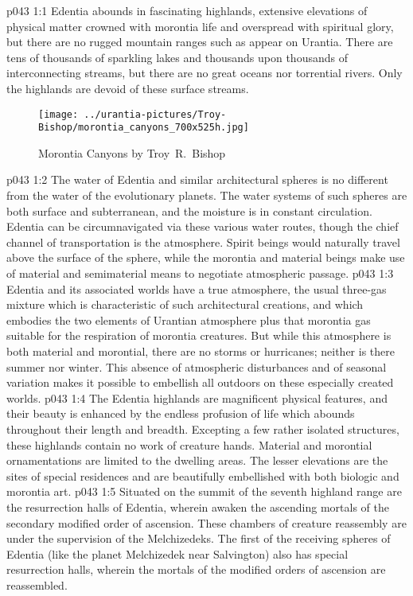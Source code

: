 \vs p043 1:1 Edentia abounds in fascinating highlands, extensive elevations of physical matter crowned with morontia life and overspread with spiritual glory, but there are no rugged mountain ranges such as appear on Urantia. There are tens of thousands of sparkling lakes and thousands upon thousands of interconnecting streams, but there are no great oceans nor torrential rivers. Only the highlands are devoid of these surface streams.
\begin{figure}[H]
\centering
\texttt{[image: ../urantia-pictures/Troy-Bishop/morontia\_canyons\_700x525h.jpg]}
\caption{Morontia Canyons by Troy~R.~Bishop}
\end{figure}
\vs p043 1:2 The water of Edentia and similar architectural spheres is no different from the water of the evolutionary planets. The water systems of such spheres are both surface and subterranean, and the moisture is in constant circulation. Edentia can be circumnavigated via these various water routes, though the chief channel of transportation is the atmosphere. Spirit beings would naturally travel above the surface of the sphere, while the morontia and material beings make use of material and semimaterial means to negotiate atmospheric passage.
\vs p043 1:3 Edentia and its associated worlds have a true atmosphere, the usual three\hyp{}gas mixture which is characteristic of such architectural creations, and which embodies the two elements of Urantian atmosphere plus that morontia gas suitable for the respiration of morontia creatures. But while this atmosphere is both material and morontial, there are no storms or hurricanes; neither is there summer nor winter. This absence of atmospheric disturbances and of seasonal variation makes it possible to embellish all outdoors on these especially created worlds.
\vs p043 1:4 The Edentia highlands are magnificent physical features, and their beauty is enhanced by the endless profusion of life which abounds throughout their length and breadth. Excepting a few rather isolated structures, these highlands contain no work of creature hands. Material and morontial ornamentations are limited to the dwelling areas. The lesser elevations are the sites of special residences and are beautifully embellished with both biologic and morontia art.
\vs p043 1:5 \pc Situated on the summit of the seventh highland range are the resurrection halls of Edentia, wherein awaken the ascending mortals of the secondary modified order of ascension. These chambers of creature reassembly are under the supervision of the Melchizedeks. The first of the receiving spheres of Edentia (like the planet Melchizedek near Salvington) also has special resurrection halls, wherein the mortals of the modified orders of ascension are reassembled.
